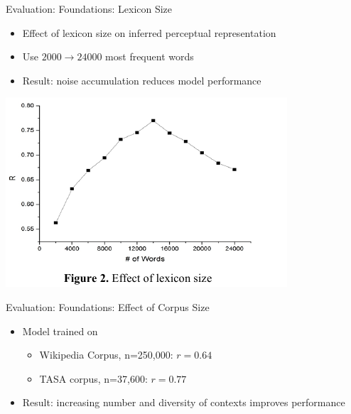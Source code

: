 \documentclass[12pt,a4paper]{beamer}
\begin{document}
\begin{frame}{Evaluation: Foundations: Lexicon Size}
\begin{itemize}
\item Effect of lexicon size on inferred perceptual representation
\item Use $2000 \to 24000$ most frequent words
\item Result: noise accumulation reduces model performance
\end{itemize}
\includegraphics[scale=0.8]{figure_2_effect_of_lexicon_size.png}

\end{frame}


\begin{frame}{Evaluation: Foundations: Effect of Corpus Size}
\begin{itemize}
\item Model trained on
    \begin{itemize}
    \item Wikipedia Corpus, n=250,000: $r = 0.64$
    \item TASA corpus, n=37,600: $r = 0.77$
    \end{itemize}
\item Result: increasing number and diversity of contexts improves performance
\end{itemize}
\end{frame}
\end{document}
